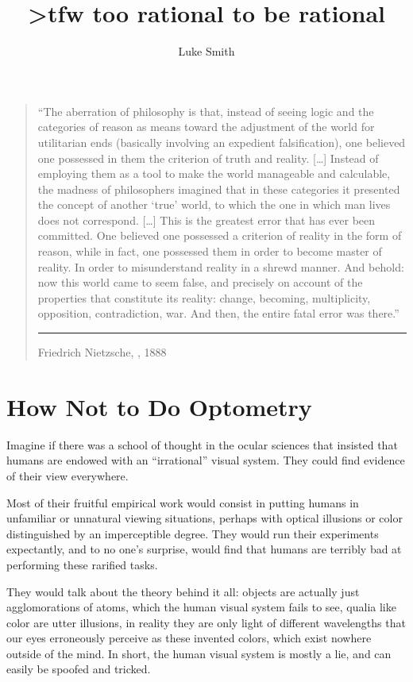 \documentclass{article}
\title{{\textgreater}tfw too rational to be rational}
\author{Luke Smith}
\begin{document}
\maketitle

\begin{quote}
``The aberration of philosophy is that, instead of seeing logic and the categories of reason as means toward the adjustment of the world for utilitarian ends (basically involving an expedient falsification), one believed one possessed in them the criterion of truth and reality.
	[\ldots]
Instead of employing them as a tool to make the world manageable and calculable, the madness of philosophers imagined that in these categories it presented the concept of another `true' world, to which the one in which man lives does not correspond.
	[\ldots]
This is the greatest error that has ever been committed.
One believed one possessed a criterion of reality in the form of reason, while in fact, one possessed them in order to become master of reality.
In order to misunderstand reality in a shrewd manner.
And behold: now this world came to seem false, and precisely on account of the properties that constitute its reality: change, becoming, multiplicity, opposition, contradiction, war.
And then, the entire fatal error was there.''
	\vspace{.25cm}\hrule
	\hfill Friedrich Nietzsche, , 1888
\end{quote}

\section{How Not to Do Optometry}

Imagine if there was a school of thought in the ocular sciences that insisted that humans are endowed with an ``irrational'' visual system.
They could find evidence of their view everywhere.

Most of their fruitful empirical work would consist in putting humans in unfamiliar or unnatural viewing situations, perhaps with optical illusions or color distinguished by an imperceptible degree.
They would run their experiments expectantly, and to no one's surprise, would find that humans are terribly bad at performing these rarified tasks.

They would talk about the theory behind it all: objects are actually just agglomorations of atoms, which the human visual system fails to see, qualia like color are utter illusions, in reality they are only light of different wavelengths that our eyes erroneously perceive as these invented colors, which exist nowhere outside of the mind.
In short, the human visual system is mostly a lie, and can easily be spoofed and tricked.
\end{document}
